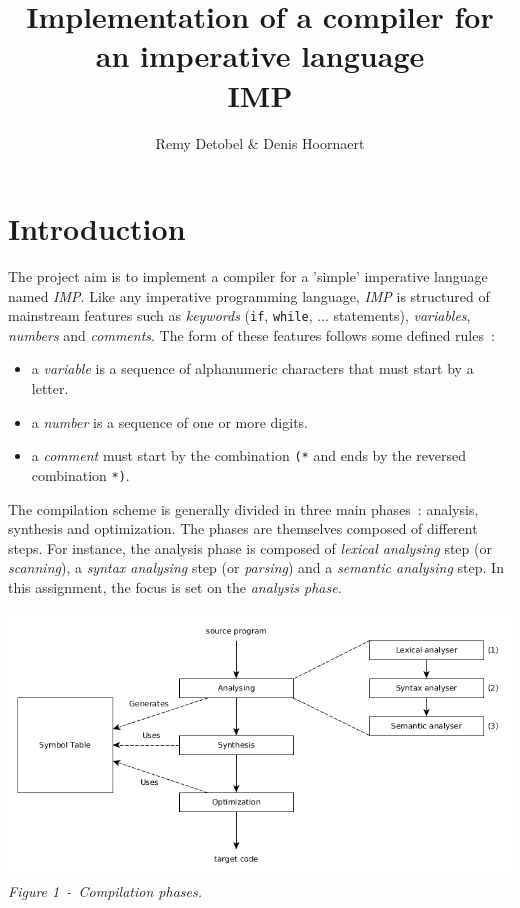 \documentclass[a4paper,11pt]{article}
\title{Implementation of a compiler for an imperative language\\IMP}
\author{Remy Detobel \& Denis Hoornaert}
\begin{document}
\maketitle

\section{Introduction}

  The project aim is to implement a compiler for a 'simple' imperative language named \textit{IMP}. Like any imperative programming language, \textit{IMP} is structured of mainstream features such as \textit{keywords} (\verb|if|, \verb|while|, ... statements), \textit{variables}, \textit{numbers} and \textit{comments}.
  The form of these features follows some defined rules~:
  \begin{itemize}
    \item a \textit{variable} is a sequence of alphanumeric characters that must start by a letter.
    \item a \textit{number} is a sequence of one or more digits.
    \item a \textit{comment} must start by the combination \verb|(*| and ends by the reversed combination \verb|*)|. 
  \end{itemize}
  The compilation scheme is generally divided in three main phases~: analysis, synthesis and optimization. The phases are themselves composed of different steps. For instance, the analysis phase is composed of \textit{lexical analysing} step (or \textit{scanning}), a \textit{syntax analysing} step (or \textit{parsing}) and a \textit{semantic analysing} step. In this assignment, the focus is set on the \textit{analysis phase}.
  \begin{center}
    \includegraphics[scale=0.5]{./img/phase_of_compiler.jpg}\\
    \textit{Figure 1~-~Compilation phases.}
  \end{center}
  
\end{document}
